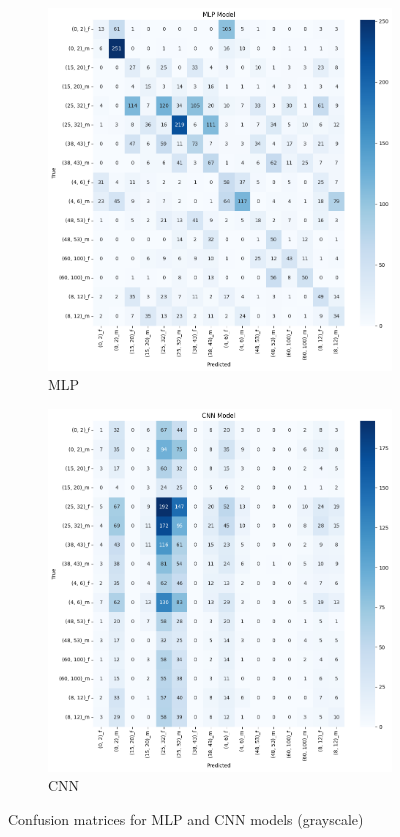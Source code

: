 \documentclass{article}
\begin{document}
\begin{figure}[H]
    \centering
    \begin{subfigure}[b]{0.48\textwidth}
        \includegraphics[width=\textwidth]{assets/confusion_matrix/grayscale/MLP.png}
        \caption{MLP}
    \end{subfigure}
    \hfill
    \begin{subfigure}[b]{0.48\textwidth}
        \includegraphics[width=\textwidth]{assets/confusion_matrix/grayscale/CNN.png}
        \caption{CNN}
    \end{subfigure}
    \caption{Confusion matrices for MLP and CNN models (grayscale)}
    \label{fig:grayscale_confusion_matrices_5}
\end{figure}
\end{document}
